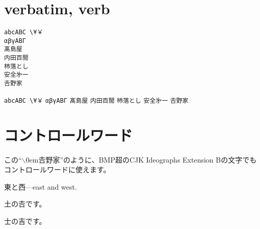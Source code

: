 \documentclass{ujarticle}
\begin{document}
\section{verbatim, verb}
\begin{verbatim}
abcABC \¥￥
αβγΑΒΓ
髙島屋
内田百閒
杮落とし
安全﻿㐧一
𠮷野家
\end{verbatim}

\verb+abcABC \¥￥+
\verb-αβγΑΒΓ-
\verb!髙島屋!
\verb/内田百閒/
\verb#杮落とし#
\verb|安全﻿㐧一|
\verb=𠮷野家=

\edef\bs{$\backslash$\kern0em}
\section{コントロールワード}
\def\𠮷野家{この``\bs 𠮷野家''のように、BMP超のCJK Ideographs Extension Bの文字でもコントロールワードに使えます。}
\𠮷野家

\newcommand\東西{東と西---east and west.}
\東西

\newif\if土の𠮷
\土の𠮷true
\def\test土の𠮷{%
\if土の𠮷
 土の𠮷です。
\else
 士の吉です。
\fi}
\土の𠮷true\test土の𠮷\quad\土の𠮷false\test土の𠮷






\end{document}
